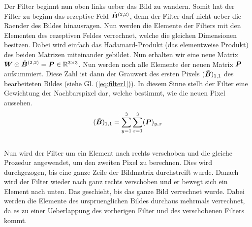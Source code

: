 \para{}
Der Filter beginnt nun oben links ueber das Bild zu wandern. Somit
hat der Filter zu beginn das rezeptive Feld $\hat{\bm{B}}^{(2,2)}$, denn der
Filter darf nicht ueber die Raender des Bildes hinausragen.
Nun werden die Elemente der Filters mit den Elementen des rezeptiven Feldes
verrechnet, welche die gleichen Dimensionen besitzen. Dabei wird einfach das
Hadamard-Produkt (das elementweise Produkt) des beiden Matrizen miteinander
gebildet. Nun erhalten wir eine neue Matrix $\bm{W} \odot
\hat{\bm{B}}^{(2,2)} = \bm{P} \in \mathbb{R}^{3 \times 3}$.
Nun werden noch alle Elemente der neuen Matrix $\bm{P}$
aufsummiert. Diese Zahl ist dann der Grauwert des ersten Pixels $(\tilde{\bm{B}})_{1,1}$ des bearbeiteten
Bildes (siehe Gl. (\ref{eq:filter1})). In diesem Sinne stellt der Filter eine Gewichtung der Nachbarspixel dar, welche
bestimmt, wie die neuen Pixel aussehen.
\\
\begin{equation}\label{eq:filter1}
  (\tilde{\bm{B}})_{1,1} = \sum_{y=1}^3 \sum_{x=1}^3 (\bm{P})_{y,x}
\end{equation}
\\
Nun wird der Filter um ein Element nach rechts verschoben und die gleiche
Prozedur angewendet, um den zweiten Pixel zu berechnen. Dies
wird durchgezogen, bis eine ganze Zeile der Bildmatrix durchstreift wurde.
Danach wird der Filter wieder nach ganz rechts verschoben und er bewegt sich ein
Element nach unten. Das geschieht, bis das ganze Bild verrechnet wurde.
Dabei werden die Elemente des urspruenglichen Bildes durchaus mehrmals
verrechnet, da es zu einer Ueberlappung des vorherigen Filter und des
verschobenen Filters kommt.
\para{}

